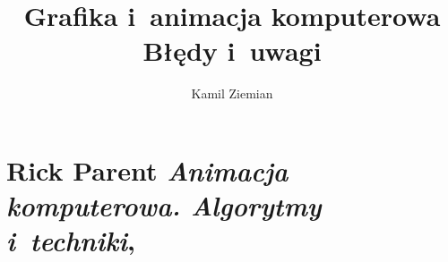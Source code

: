 \documentclass[a4paper,11pt]{article}
\title{Grafika i~animacja komputerowa \\
  {\Large Błędy i~uwagi}}
\author{Kamil Ziemian}
\numberwithin{equation}{section}
\begin{document}





\maketitle










\section{Rick Parent \textit{Animacja komputerowa. Algorytmy
    i~techniki},
  \parencite{Parent-Animacja-komputerowa-Algorytmy-i-techniki-Pub-2012}}

\label{sec:Parent}





\noindent






\noindent









\noindent
{}

\end{document}

